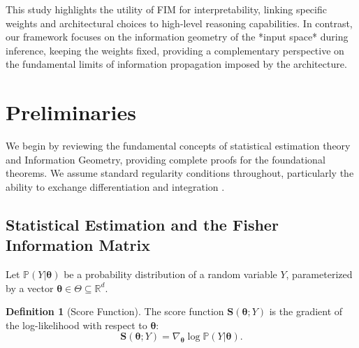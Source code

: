 \documentclass{article}
\theoremstyle{definition}
\newtheorem{definition}[theorem]{Definition}
\begin{document}
This study highlights the utility of FIM for interpretability, linking specific weights and architectural choices to high-level reasoning capabilities. In contrast, our framework focuses on the information geometry of the *input space* during inference, keeping the weights fixed, providing a complementary perspective on the fundamental limits of information propagation imposed by the architecture.

\section{Preliminaries}
We begin by reviewing the fundamental concepts of statistical estimation theory and Information Geometry, providing complete proofs for the foundational theorems. We assume standard regularity conditions throughout, particularly the ability to exchange differentiation and integration \cite{lehmann1998theory}.

\subsection{Statistical Estimation and the Fisher Information Matrix}

Let $\mathbb{P}(Y|\boldsymbol{\theta})$ be a probability distribution of a random variable $Y$, parameterized by a vector $\boldsymbol{\theta} \in \Theta \subseteq \mathbb{R}^d$.

\begin{definition}[Score Function]
The score function $\mathbf{S}(\boldsymbol{\theta}; Y)$ is the gradient of the log-likelihood with respect to $\boldsymbol{\theta}$:
\begin{equation}
    \mathbf{S}(\boldsymbol{\theta}; Y) = \nabla_{\boldsymbol{\theta}} \log \mathbb{P}(Y|\boldsymbol{\theta}).
\end{equation}
\end{definition}
\end{document}
